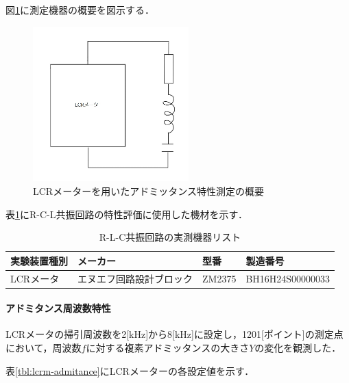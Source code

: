 \documentclass[dvipdfmx,titlepage,a4j]{jsarticle}  %
\numberwithin{equation}{section}
\begin{document}
図\ref{fig:fig7-meter.jpg}に測定機器の概要を図示する．
\begin{figure}[H]
  \centering
  \includegraphics[width=6cm]{../fig/fig7-meter.jpg}
  \caption{LCRメーターを用いたアドミッタンス特性測定の概要}
  \label{fig:fig7-meter.jpg}
\end{figure}

表\ref{tbl:r-l-c-list}にR-C-L共振回路の特性評価に使用した機材を示す．

\begin{table}[htbp]
  \caption{R-L-C共振回路の実測機器リスト}
  \begin{center}
    \begin{tabular}{l|l|l|l}
      \hline
      実験装置種別 & メーカー                 & 型番   & 製造番号         \\ \hline \hline
      LCRメータ    & エヌエフ回路設計ブロック & ZM2375 & BH16H24S00000033 \\ \hline
    \end{tabular}
  \end{center}
  \label{tbl:r-l-c-list}
\end{table}


\paragraph{アドミタンス周波数特性}
LCRメータの掃引周波数を2[kHz]から8[kHz]に設定し，1201[ポイント]の測定点において，周波数$f$に対する複素アドミッタンスの大きさ$Y$の変化を観測した．

表\ref{tbl:lcrm-admitance}にLCRメーターの各設定値を示す．
\end{document}
